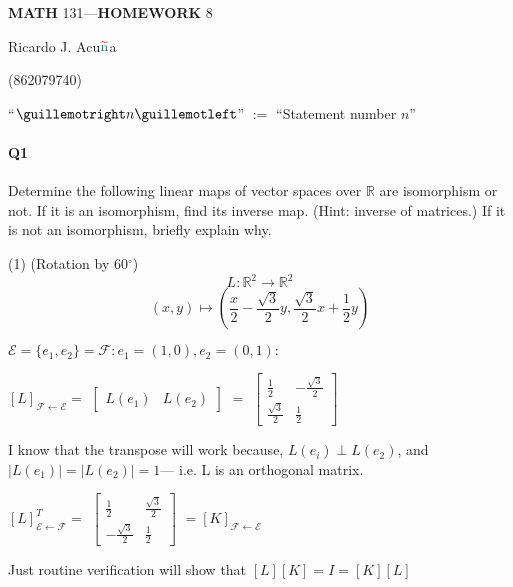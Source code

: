 \documentclass{article}
\begin{document}
\begin{center}
  \textbf{MATH} 131---\textbf{HOMEWORK} 8

  \color{red}R\color{teal}icardo
  \color{red}J\color{cyan}.
  \color{red}A\color{teal}cu$\color{red}{\widetilde{\color{teal}\text{n}}}$\color{teal}a\color{black}

  \color{teal}(\color{red}862079740\color{teal})\color{black}
\end{center}\vspace{1.618em}

``$\guillemotright n \guillemotleft$'' $:= $ ``Statement number $n$''

\paragraph{Q1} Determine the following linear maps of vector spaces over $\mathbb{R}$ are
isomorphism or not. If it is an isomorphism, find its inverse map. (Hint: inverse of
matrices.) If it is not an isomorphism, briefly explain why.

(1) (Rotation by 60$^\circ$)
\[L:\mathbb{R}^2 \rightarrow \mathbb{R}^2\]
\[(x,y) \mapsto (\frac{x}{2} -\frac{\sqrt{3}}{2}y, \frac{\sqrt{3}}{2}x +\frac{1}{2}y)\]

$\mathcal{E}=\{e_1,e_2\}=\mathcal{F}: e_1 = (1,0), e_2 = (0,1):$

$ [ L ]_{\mathcal{F} \leftarrow \mathcal{E}} =$
$\left[
  \begin{array}{c|c}
    L(e_1)&L(e_2)
  \end{array}
\right]
$
$=$
$
\begin{bmatrix}
  \frac{1}{2} & -\frac{\sqrt{3}}{2}\\
   \frac{\sqrt{3}}{2} & \frac{1}{2}
\end{bmatrix}
$

I know that the transpose will work because, $L(e_i) \perp L(e_2)$,
and $|L(e_1)|=|L(e_2)|=1$--- i.e. L is an orthogonal matrix.

$ [ L ]_{\mathcal{E} \leftarrow \mathcal{F}}^T =$
$
\begin{bmatrix}
  \frac{1}{2} & \frac{\sqrt{3}}{2}\\
  -\frac{\sqrt{3}}{2} & \frac{1}{2}
\end{bmatrix}
$
$= [ K ]_{\mathcal{F} \leftarrow \mathcal{E}}$

Just routine verification will show that $[L][K] = I = [K][L]$
\end{document}
